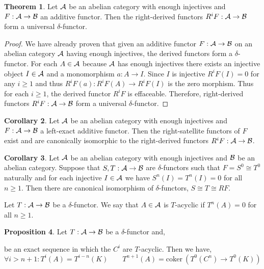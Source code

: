 \documentclass[12pt]{extarticle}
\newcommand{\coker}[1]{\mathrm{coker}\: #1}
\theoremstyle{definition}
\newtheorem{theorem}{Theorem}[section]
\newtheorem{proposition}[theorem]{Proposition}
\newtheorem{corollary}[theorem]{Corollary}
\newenvironment{definition}[1][Definition:]{\begin{trivlist}
\item[\hskip \labelsep {\bfseries #1}]}{\end{trivlist}}
\begin{document}
\begin{theorem}
Let $\mathcal{A}$ be an abelian category with enough injectives and $F : \mathcal{A} \to \mathcal{B}$ an additive functor. Then the right-derived functors $R^i F : \mathcal{A} \to \mathcal{B}$ form a universal $\delta$-functor.
\end{theorem}

\begin{proof}
We have already proven that given an additive functor $F : \mathcal{A} \to \mathcal{B}$ on an abelian category $\mathcal{A}$ having enough injectives, the derived functors form a $\delta$-functor. 
For each $A \in \mathcal{A}$ because $\mathcal{A}$ has enough injectives there exists an injective object $I \in \mathcal{A}$ and a monomorphism $a : A \to I$. Since $I$ is injective $R^i F(I) = 0$ for any $i \ge 1$ and thus $R^iF(a) : R^i F(A) \to R^i F(I)$ is the zero morphism. Thus for each $i \ge 1$, the derived functor $R^i F$ is effaceable. Therefore, right-derived functors $R^i F : \mathcal{A} \to \mathcal{B}$ form a universal $\delta$-functor.
\end{proof}

\begin{corollary}
Let $\mathcal{A}$ be an abelian category with enough injectives and $F : \mathcal{A} \to \mathcal{B}$ a left-exact additive functor. Then the right-satellite functors of $F$ exist and are canonically isomorphic to the right-derived functors $R^i F : \mathcal{A} \to \mathcal{B}$.
\end{corollary}

\begin{corollary}
Let $\mathcal{A}$ be an abelian category with enough injectives and $\mathcal{B}$ be an abelian category.
Suppose that $S, T : \mathcal{A} \to \mathcal{B}$ are $\delta$-functors such that $F = S^0 \cong T^0$ naturally and for each injective $I \in \mathcal{A}$ we have $S^n(I) = T^n(I) = 0$ for all $n \ge 1$. Then there are canonical isomorphism of $\delta$-functors, $S \cong T \cong R F$. 
\end{corollary}

\begin{definition}
Let $T : \mathcal{A} \to \mathcal{B}$ be a $\delta$-functor. We say that $A \in \mathcal{A}$ is $T$-acyclic if $T^n(A) = 0$ for all $n \ge 1$.
\end{definition}

\begin{proposition}
Let $T : \mathcal{A} \to \mathcal{B}$ be a $\delta$-functor and,
\begin{center}
\end{center}
be an exact sequence in which the $C^i$ are $T$-acyclic. Then we have,
\[ \forall i > n + 1 : T^{i}(A) = T^{i - n}(K) \quad \quad T^{n+1}(A) = \coker{(T^0(C^n) \to T^0(K))} \] 
\end{proposition}
\end{document}
